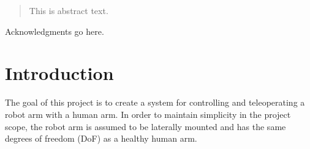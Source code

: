 \uomtoc


\begin{abstract} %
  This is abstract text. 
  
  \lipsum[1-2]
\end{abstract}%
\clearpage



\begin{uomoriginality}
  \uomoriginalitydeclaration 
\end{uomoriginality}
\uomcopyrightstatement



\begin{uomacknowledgements}
Acknowledgments go here.
\end{uomacknowledgements}



\uomstartmainbody %



\section{Introduction} %
  
  The goal of this project is to create a system for controlling and teleoperating a robot arm with a human arm. 
  In order to maintain simplicity in the project scope, the robot arm is assumed to be laterally mounted and has the same degrees of freedom (DoF) as a healthy human arm.


